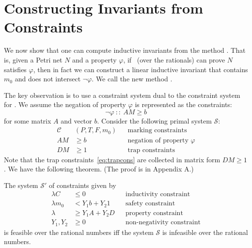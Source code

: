 \section{Constructing Invariants from Constraints}
\label{sec_method_invariant_by_refinement}


We now show that one can compute inductive invariants from the method \safetyref.
That is, given a Petri net $N$ and a property $\varphi$, if \safetyref\ (over the rationals)
can prove $N$ satisfies $\varphi$, then in fact we can construct a linear inductive invariant
that contains $m_0$ and does not intersect $\lnot\varphi$. We call the
new method \invariantref.

The key observation is to use a constraint system dual to the constraint system for \safetyref.
%
We assume the negation of property $\varphi$ is represented as the constraints:
$$ \neg \varphi\  :: \ A M \ge b $$
for some matrix $A$ and vector $b$.
Consider the following primal system $\mathcal{S}$:
\begin{align*}
  \mathcal{C}&(P, T, F, m_0)  && \text{marking constraints} \\
  A M & \ge b                 && \text{negation of property $\varphi$} \\
  D M & \ge 1                 && \text{trap constraints}
\end{align*}
%
Note that the trap constraints~\eqref{eq:trapcons} are collected in matrix form $D M \geq 1$.
We have the following theorem. (The proof is in Appendix A.)

\begin{theorem}
\label{thm:dual}
The system $\mathcal{S}'$ of constraints given by
\begin{align*}
  \lambda C    & \le 0            && \text{inductivity constraint} \\
  \lambda m_0  & <   Y_1 b + Y_2 1 && \text{safety constraint} \\
  \lambda      & \ge Y_1 A + Y_2 D && \text{property constraint} \\
  Y_1, Y_2     & \ge 0     && \text{non-negativity constraint} 
\end{align*}
is feasible over the rational numbers if{}f the system $\mathcal{S}$ is infeasible
over the rational numbers.
\end{theorem}



